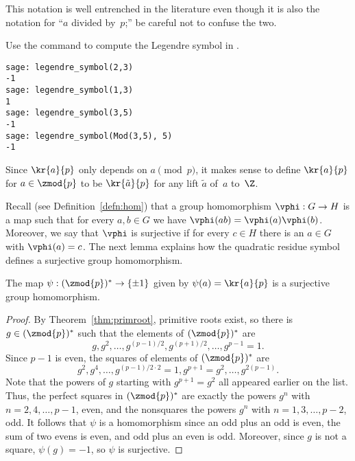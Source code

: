 This notation is well entrenched in the literature even though it
is also the notation for ``$a$ divided by~$p$;'' be careful
not to confuse the two.

\begin{sg}
Use the  command to
compute the Legendre symbol in \sage.
\begin{verbatim}
sage: legendre_symbol(2,3)
-1
sage: legendre_symbol(1,3)
1
sage: legendre_symbol(3,5)
-1
sage: legendre_symbol(Mod(3,5), 5)
-1
\end{verbatim}
\end{sg}

Since $\kr{a}{p}$ only depends on $a\pmod{p}$, it makes sense
to define $\kr{a}{p}$ for $a\in \zmod{p}$ to be $\kr{\tilde{a}}{p}$ for
any lift $\tilde{a}$ of~$a$ to~$\Z$.

Recall (see Definition~\ref{defn:hom}) that a group
homomorphism $\vphi:G \to H$ is a map such that for every
$a,b\in G$ we have $\vphi(ab) = \vphi(a)\vphi(b)$.
Moreover, we say that $\vphi$ is surjective if for every
$c\in H$ there is an $a\in G$ with $\vphi(a) = c$.
The next lemma explains how the quadratic
residue symbol defines a surjective group homomorphism.

\begin{lemma}\label{lem:qrhom}
  The map $\psi:(\zmod{p})^*\to \{\pm 1\}$ given by
$\psi(a) = \kr{a}{p}$ is a surjective group homomorphism.
\end{lemma}
\begin{proof}
  By Theorem~\ref{thm:primroot}, primitive roots exist, so
there is $g\in (\zmod{p})^*$ such that the elements of $(\zmod{p})^*$ are
$$
  g, g^2, \ldots, g^{(p-1)/2}, g^{(p+1)/2}, \ldots, g^{p-1}=1.
$$
Since $p-1$ is even, the squares of elements of $(\zmod{p})^*$ are
$$
  g^2, g^4, \ldots, g^{(p-1)/2 \cdot 2}=1, g^{p+1}=g^2,\ldots, g^{2(p-1)}.
$$
Note that the powers of $g$ starting with $g^{p+1}=g^2$ all appeared
earlier on the list.  Thus, the perfect squares in $(\zmod{p})^*$ are
exactly the powers $g^n$ with $n=2,4,\ldots,p-1$, even, and the
nonsquares the powers $g^n$ with $n=1,3,\ldots,p-2$, odd.  It follows
that $\psi$ is a homomorphism since an odd plus an odd is even, the
sum of two evens is even, and odd plus an even is odd. Moreover,
since $g$ is not a square, $\psi(g)=-1$, so $\psi$ is surjective.

\end{proof}

